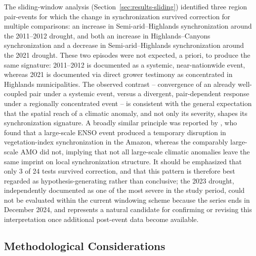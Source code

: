 \documentclass[climate,article,submit,moreauthors]{Definitions/mdpi}
\begin{document}
The sliding-window analysis (Section~\ref{sec:results-sliding}) identified
three region pair-events for which the change in synchronization survived
correction for multiple comparisons: an increase in Semi-arid--Highlands
synchronization around the 2011--2012 drought, and both an increase in
Highlands--Canyons synchronization and a decrease in Semi-arid--Highlands
synchronization around the 2021 drought. These two episodes were not
expected, a priori, to produce the same signature: 2011--2012 is documented
as a systemic, near-nationwide event, whereas 2021 is documented via direct
grower testimony as concentrated in Highlands municipalities. The observed
contrast -- convergence of an already well-coupled pair under a systemic
event, versus a divergent, pair-dependent response under a regionally
concentrated event -- is consistent with the general expectation that the
spatial reach of a climatic anomaly, and not only its severity, shapes its
synchronization signature. A broadly similar principle was reported by
\cite{Semeraro2020}, who found that a large-scale ENSO event produced a
temporary disruption in vegetation-index synchronization in the Amazon,
whereas the comparably large-scale AMO did not, implying that not all
large-scale climatic anomalies leave the same imprint on local
synchronization structure. It should be emphasized that only 3 of 24 tests
survived correction, and that this pattern is therefore best regarded as
hypothesis-generating rather than conclusive; the 2023 drought, independently
documented as one of the most severe in the study period, could not be
evaluated within the current windowing scheme because the series ends in
December 2024, and represents a natural candidate for confirming or
revising this interpretation once additional post-event data become
available.

\subsection{Methodological Considerations}
\label{sec:disc-methods}
\end{document}
